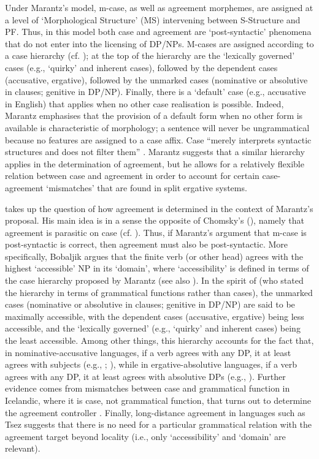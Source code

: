 \documentclass[output=paper]{langsci/langscibook}
\begin{document}
Under Marantz’s model, m-case, as well as agreement morphemes, are assigned at a level of ‘Morphological Structure’ (MS) intervening between S-Structure and PF. Thus, in this model both case and agreement are ‘post-syntactic’ phenomena that do not enter into the licensing of DP/NPs. M-cases are assigned according to a case hierarchy (cf. \citealt{Yip1987}); at the top of the hierarchy are the ‘lexically governed’ cases (e.g., ‘quirky’ and inherent cases), followed by the dependent cases (accusative, ergative), followed by the unmarked cases (nominative or absolutive in clauses; genitive in DP/NP). Finally, there is a ‘default’ case (e.g., accusative in English) that applies when no other case realisation is possible. Indeed, Marantz emphasises that the provision of a default form when no other form is available is characteristic of morphology; a sentence will never be ungrammatical because no features are assigned to a case affix. Case “merely interprets syntactic structures and does not filter them” \citep[24]{Marantz1991}. Marantz suggests that a similar hierarchy applies in the determination of agreement, but he allows for a relatively flexible relation between case and agreement in order to account for certain case-agreement ‘mismatches’ that are found in split ergative systems.

\citet{Bobaljik2008Phi} takes up the question of how agreement is determined in the context of Marantz’s proposal. His main idea is in a sense the opposite of Chomsky’s (\citeyear{Chomsky2000,Chomsky2001Derivation}), namely that agreement is parasitic on case (cf. \citealt{Bittner1996}). Thus, if Marantz’s argument that m-case is post-syntactic is correct, then agreement must also be post-syntactic. More specifically, Bobaljik argues that the finite verb (or other head) agrees with the highest ‘accessible’ NP in its ‘domain’, where ‘accessibility’ is defined in terms of the case hierarchy proposed by Marantz (see also \citealt{McFadden2004}). In the spirit of \citet{Moravcsik1974} (who stated the hierarchy in terms of grammatical functions rather than cases), the unmarked cases (nominative or absolutive in clauses; genitive in DP/NP) are said to be maximally accessible, with the dependent cases (accusative, ergative) being less accessible, and the ‘lexically governed’ (e.g., ‘quirky’ and inherent cases) being the least accessible. Among other things, this hierarchy accounts for the fact that, in nominative-accusative languages, if a verb agrees with any DP, it at least agrees with subjects (e.g., \citealt{Moravcsik1974}; \citealt{Gilligan1987}), while in ergative-absolutive languages, if a verb agrees with any DP, it at least agrees with absolutive DPs (e.g., \citealt{Croft1990}). Further evidence comes from mismatches between case and grammatical function in Icelandic, where it is case, not grammatical function, that turns out to determine the agreement controller \citep{Sigurðsson1993}. Finally, long-distance agreement in languages such as Tsez \citep{Polinsky2001} suggests that there is no need for a particular grammatical relation with the agreement target beyond locality (i.e., only ‘accessibility’ and ‘domain’ are relevant).
\end{document}
